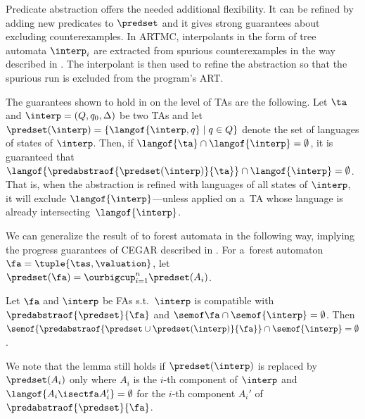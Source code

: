 Predicate abstraction offers the needed additional flexibility.  
It can be refined by adding new predicates to $\predset$ and it gives strong guarantees about excluding counterexamples.
%
In ARTMC, interpolants in the form of tree automata $\interp_i$ are extracted
from spurious counterexamples in the way described in .
%
The interpolant is then used to refine the abstraction so that the spurious run is excluded from the program's ART.

The guarantees shown to hold in \cite{artmc} on the level of TAs are 
the following.  
Let $\ta$ and $\interp = (Q,q_0,\Delta)$ be two TAs and 
let $\predset(\interp) = \{\langof{\interp,q}\mid q\in Q\}$ denote the set of languages of states of $\interp$.
%
Then, if $\langof{\ta} \cap \langof{\interp} = \emptyset$, it is guaranteed that 
$\langof{\predabstraof{\predset(\interp)}{\ta}} \cap \langof{\interp} = \emptyset$.
That is, when the abstraction is refined with languages of all states of
$\interp$, it will
exclude $\langof{\interp}$---unless applied on a~TA whose language is already
intersecting~$\langof{\interp}$. 


We can generalize the result of \cite{artmc} to forest automata in the
following way,
implying the progress guarantees of CEGAR described in .
For a~forest automaton $\fa = \tuple{\tas,\valuation}$, let $\predset(\fa) =  \ourbigcup_{i=1}^n\predset({A_i})$.
\begin{lemma}
Let $\fa$ and $\interp$ be FAs s.t.~$\interp$ is compatible with $\predabstraof{\predset}{\fa}$ and
$\semof\fa\cap\semof{\interp} = \emptyset$.
Then
$\semof{\predabstraof{\predset\cup\predset(\interp)}{\fa}} \cap \semof{\interp} = \emptyset$.
\end{lemma}
%
We note that the lemma still holds if $\predset(\interp)$ is replaced by
$\predset({A_i})$ only where $A_i$ is the $i$-th component of $\interp$ and $\langof{A_i \isectfa A_i'} = \emptyset$ for the $i$-th component $A_i'$ of $\predabstraof{\predset}{\fa}$. 


